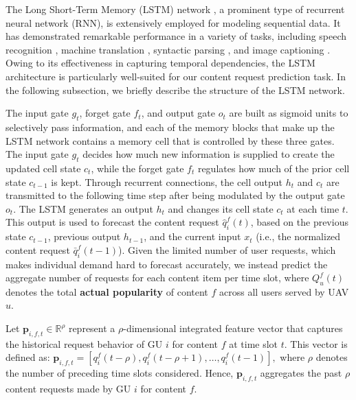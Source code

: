 \documentclass[journal]{IEEEtran}
\begin{document}
The Long Short-Term Memory (LSTM) network \cite{hochreiter1997long}, a prominent type of recurrent neural network (RNN), is extensively employed for modeling sequential data. It has demonstrated remarkable performance in a variety of tasks, including speech recognition \cite{graves2014towards}, machine translation \cite{sutskever2014sequence}, syntactic parsing \cite{vinyals2015grammar}, and image captioning \cite{xu2015show}. Owing to its effectiveness in capturing temporal dependencies, the LSTM architecture is particularly well-suited for our content request prediction task. In the following subsection, we briefly describe the structure of the LSTM network.

The input gate $g_t$, forget gate $f_t$, and output gate $o_t$ are built as sigmoid units to selectively pass information, and each of the memory blocks that make up the LSTM network contains a memory cell that is controlled by these three gates. The input gate $g_t$ decides how much new information is supplied to create the updated cell state $c_t$, while the forget gate $f_t$ regulates how much of the prior cell state $c_{t-1}$ is kept. Through recurrent connections, the cell output $h_t$ and $c_t$ are transmitted to the following time step after being modulated by the output gate $o_t$. The LSTM generates an output $h_t$ and changes its cell state $c_t$ at each time $t$. This output is used to forecast the content request $\hat{q}^f_i(t)$, based on the previous state $c_{t-1}$, previous output $h_{t-1}$, and the current input $x_t$ (i.e., the normalized content request $\bar{q}^f_i(t-1)$). Given the limited number of user requests, which makes individual demand hard to forecast accurately, we instead predict the aggregate number of requests for each content item per time slot, where $Q^f_u(t)$ denotes the total \textbf{actual popularity} of content $f$ across all users served by UAV $u$.

Let \( {\textbf{p}}_{i,f,t} \in \mathbb{R}^\rho \) represent a \( \rho \)-dimensional integrated feature vector that captures the historical request behavior of GU \( i \) for content \( f \) at time slot \( t \). This vector is defined as:
\(
{\textbf{p}}_{i,f,t} = [q^f_{i}(t - \rho), q^f_{i}(t - \rho + 1), \dots, q^f_{i}(t - 1)],
\)
where \( \rho \) denotes the number of preceding time slots considered. Hence, \( \textbf{p}_{i,f,t} \) aggregates the past \( \rho \) content requests made by GU \( i \) for content \( f \).
\end{document}
